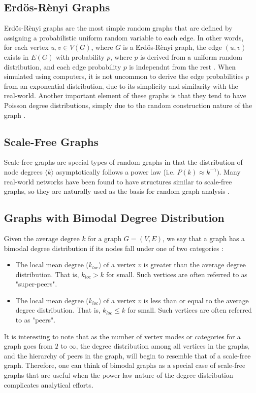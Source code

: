 \documentclass[doc]{apa}%
\begin{document}
\subsection{Erd\"{o}s-R\`{e}nyi Graphs}
Erd\"{o}s-R\`{e}nyi graphs are the most simple random graphs that are defined by assigning a probabilistic uniform random variable to each edge. In other words, for each vertex $u, v \in V(G)$, where $G$ is a Erd\"{o}s-R\`{e}nyi graph, the edge $(u,v)$ exists in $E(G)$ with probability $p$, where $p$ is derived from a uniform random distribution, and each edge probability $p$ is independnt from the rest \cite{LargeNetworkRobustness-PVM}. When simulated using computers, it is not uncommon to derive the edge probabilities $p$ from an exponential distribution, due to its simplicity and similarity with the real-world. Another important element of these graphs is that they tend to have Poisson degree distributions, simply due to the random construction nature of the graph \cite{bimodal}.


\subsection{Scale-Free Graphs}
Scale-free graphs are special types of random graphs in that the distribution of node degrees $\langle k \rangle$ asymptotically follows a power law (i.e. $P(k) \approx k^{-\gamma})$. Many real-world networks have been found to have structures similar to scale-free graphs, so they are naturally used as the basis for random graph analysis \cite{AttacksWavesRandom}. 


\subsection{Graphs with Bimodal Degree Distribution}

Given the average degree $k$ for a graph $G = (V,E)$, we say that a graph has a bimodal degree distribution if its nodes fall under one of two categories \cite{bimodal}:
\begin{itemize}
	\item The local mean degree ($k_{loc}$) of a vertex $v$ is greater than the average degree distribution. That is, $k_{loc} > k$ for small. Such vertices are often referred to as "super-peers".
	\item The local mean degree ($k_{loc}$) of a vertex $v$ is less than or equal to the average degree distribution. That is, $k_{loc} \leq k$ for small. Such vertices are often referred to as "peers".
\end{itemize}
It is interesting to note that as the number of vertex modes or categories for a graph goes from $2$ to $\infty$, the degree distribution among all vertices in the graphs, and the hierarchy of peers in the graph, will begin to resemble that of a scale-free graph. Therefore, one can think of bimodal graphs as a special case of scale-free graphs that are useful when the power-law nature of the degree distribution complicates analytical efforts.
\end{document}
